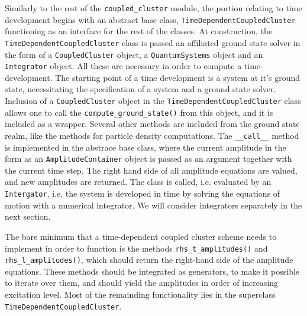    Similarly to the rest of the \lstinline{coupled_cluster} module, the portion relating
    to time development begins with an abstract base class,
    \lstinline{TimeDependentCoupledCluster}
    functioning as an interface for the rest of the classes. At construction, the 
    \lstinline{TimeDependentCoupledCluster} class is passed an affiliated 
    ground state solver in the form of a \lstinline{CoupledCluster} object, a 
    \lstinline{QuantumSystems} object and an \lstinline{Integrator} object. All these 
    are necessary in order to compute a time-development. The starting point of a 
    time development is a system at it's ground state, necessitating the specification 
    of a system and a ground state solver.
    Inclusion of a \lstinline{CoupledCluster} object in the 
    \lstinline{TimeDependentCoupledCluster} class allows one to call the 
    \lstinline{compute_ground_state()} from this object, and it is included as a 
    wrapper. Several other methods are included from the ground state realm, like 
    the methods for particle density computations. 
    The \lstinline{__call__} method is implemented in 
    the abstrace base class, where the current amplitude in the form as an 
    \lstinline{AmplitudeContainer} object is passed as an argument 
    together with the current time step. The right hand side of all amplitude equations 
    are valued, and new amplitudes are returned. The class is called, i.e. evaluated 
    by an \lstinline{Intergator}, i.e. the system is developed in time by solving 
    the equations of motion with a numerical integrator.  We will consider 
    integrators separately in the next section.

    

    The bare minimum that a time-dependent coupled cluster scheme needs to implement 
    in order to function is the methods \lstinline{rhs_t_amplitudes()} and 
    \lstinline{rhs_l_amplitudes()}, which should return the right-hand side of 
    the amplitude equations. These methods should be integrated as generators, to make 
    it possible to iterate over them, and should yield the amplitudes in order of 
    increasing excitation level. Most of the remainding functionality lies in the 
    superclass \lstinline{TimeDependentCoupledCluster}.

